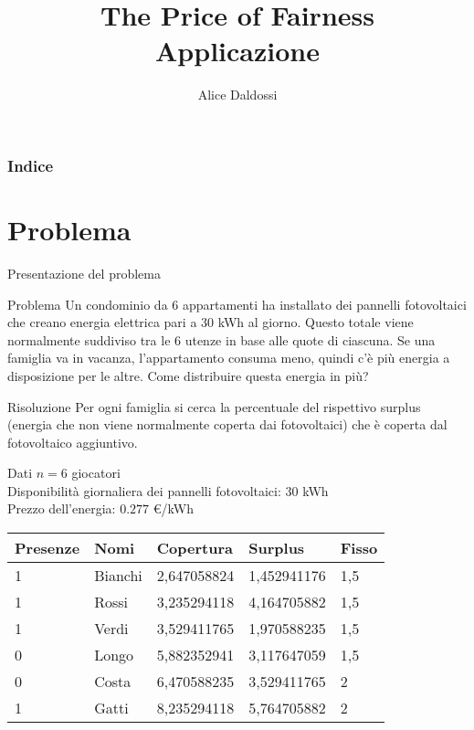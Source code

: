 \documentclass{beamer}
\title{The Price of Fairness\\Applicazione}
\author{Alice Daldossi}
\institute{Università degli Studi di Pavia}
\date
\begin{document}
	
	\frame{\titlepage}
	
\begin{frame}
	\frametitle{Indice}
	\tableofcontents
\end{frame}

\section{Problema}

\begin{frame}{Presentazione del problema}
\begin{block}{Problema}
	Un condominio da 6 appartamenti ha installato dei pannelli fotovoltaici che creano energia elettrica pari a 30 kWh al giorno. Questo totale viene normalmente suddiviso tra le 6 utenze in base alle quote di ciascuna. Se una famiglia va in vacanza, l'appartamento consuma meno, quindi c'è più energia a disposizione per le altre. Come distribuire questa energia in più?
\end{block}
\begin{block}{Risoluzione}
	 Per ogni famiglia si cerca la percentuale del rispettivo surplus (energia che non viene normalmente coperta dai fotovoltaici) che è coperta dal fotovoltaico aggiuntivo.
\end{block}
\end{frame}

\begin{frame}{Dati}
	$n=6$ giocatori\\
	Disponibilità giornaliera dei pannelli fotovoltaici: $30$ kWh\\
	Prezzo dell'energia: $0.277$ \euro/kWh
	\begin{tabular}{|l|l|l|l|l|}
		\hline
		\textbf{Presenze} & \textbf{Nomi} & \textbf{Copertura} & \textbf{Surplus} & \textbf{Fisso}\\
		\hline
		1 & Bianchi & 2,647058824 & 1,452941176 & 1,5 \\
		1 & Rossi & 3,235294118 & 4,164705882 & 1,5	\\
		1 & Verdi & 3,529411765 & 1,970588235 & 1,5	\\
		0 & Longo & 5,882352941 & 3,117647059 & 1,5	\\
		0 & Costa & 6,470588235 & 3,529411765 & 2 \\
		1 & Gatti & 8,235294118 & 5,764705882 & 2 \\
		\hline
	\end{tabular}
\end{frame}
\end{document}
